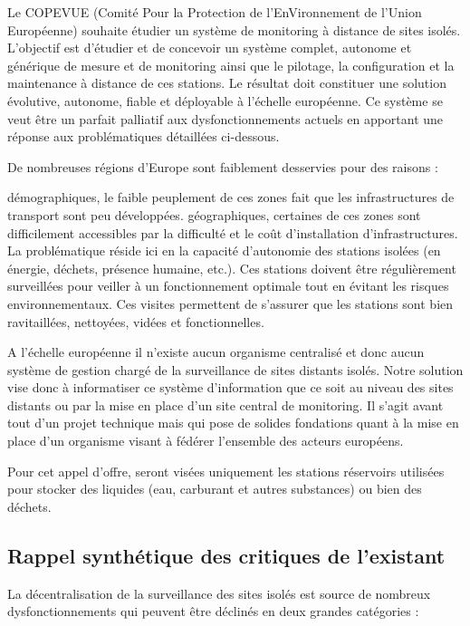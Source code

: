 \documentclass[a4paper]{article}
\begin{document}
Le COPEVUE (Comité Pour la Protection de l'EnVironnement de l'Union Européenne) souhaite étudier un système de monitoring à distance de sites isolés. L'objectif est d'étudier et de concevoir un système complet, autonome et générique de mesure et de monitoring ainsi que le pilotage, la configuration et la maintenance à distance de ces stations. Le résultat doit constituer une solution évolutive, autonome, fiable et déployable à l'échelle européenne. Ce système se veut être un parfait palliatif aux dysfonctionnements actuels en apportant une réponse aux problématiques détaillées ci-dessous.

De nombreuses régions d'Europe sont faiblement desservies pour des raisons :

démographiques, le faible peuplement de ces zones fait que les infrastructures de transport sont peu développées.
géographiques, certaines de ces zones sont difficilement accessibles par la difficulté et le coût d'installation d'infrastructures.
La problématique réside ici en la capacité d'autonomie des stations isolées (en énergie, déchets, présence humaine, etc.). Ces stations doivent être régulièrement surveillées pour veiller à un fonctionnement optimale tout en évitant les risques environnementaux. Ces visites permettent de s'assurer que les stations sont bien ravitaillées, nettoyées, vidées et fonctionnelles.

A l'échelle européenne il n'existe aucun organisme centralisé et donc aucun système de gestion chargé de la surveillance de sites distants isolés. Notre solution vise donc à informatiser ce système d'information que ce soit au niveau des sites distants ou par la mise en place d'un site central de monitoring. Il s'agit avant tout d'un projet technique mais qui pose de solides fondations quant à la mise en place d'un organisme visant à fédérer l'ensemble des acteurs européens.

Pour cet appel d'offre, seront visées uniquement les stations réservoirs utilisées pour stocker des liquides (eau, carburant et autres substances) ou bien des déchets.

\subsection{Rappel synthétique des critiques de l’existant}

La décentralisation de la surveillance des sites isolés est source de nombreux dysfonctionnements qui peuvent être déclinés en deux grandes catégories :
\end{document}
